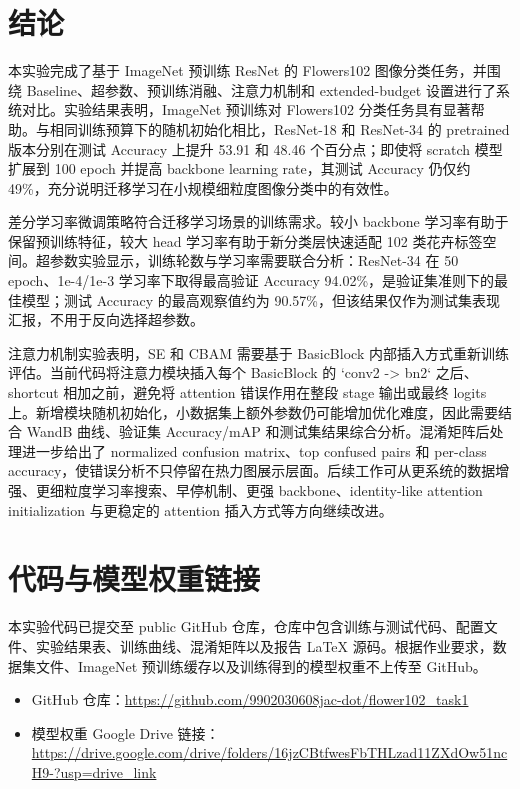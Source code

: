 \documentclass[UTF8]{ctexart}
\begin{document}
\section{结论}
本实验完成了基于 ImageNet 预训练 ResNet 的 Flowers102 图像分类任务，并围绕 Baseline、超参数、预训练消融、注意力机制和 extended-budget 设置进行了系统对比。实验结果表明，ImageNet 预训练对 Flowers102 分类任务具有显著帮助。与相同训练预算下的随机初始化相比，ResNet-18 和 ResNet-34 的 pretrained 版本分别在测试 Accuracy 上提升 53.91 和 48.46 个百分点；即使将 scratch 模型扩展到 100 epoch 并提高 backbone learning rate，其测试 Accuracy 仍仅约 49\%，充分说明迁移学习在小规模细粒度图像分类中的有效性。

差分学习率微调策略符合迁移学习场景的训练需求。较小 backbone 学习率有助于保留预训练特征，较大 head 学习率有助于新分类层快速适配 102 类花卉标签空间。超参数实验显示，训练轮数与学习率需要联合分析：ResNet-34 在 50 epoch、1e-4/1e-3 学习率下取得最高验证 Accuracy 94.02\%，是验证集准则下的最佳模型；测试 Accuracy 的最高观察值约为 90.57\%，但该结果仅作为测试集表现汇报，不用于反向选择超参数。

注意力机制实验表明，SE 和 CBAM 需要基于 BasicBlock 内部插入方式重新训练评估。当前代码将注意力模块插入每个 BasicBlock 的 `conv2 -> bn2` 之后、shortcut 相加之前，避免将 attention 错误作用在整段 stage 输出或最终 logits 上。新增模块随机初始化，小数据集上额外参数仍可能增加优化难度，因此需要结合 WandB 曲线、验证集 Accuracy/mAP 和测试集结果综合分析。混淆矩阵后处理进一步给出了 normalized confusion matrix、top confused pairs 和 per-class accuracy，使错误分析不只停留在热力图展示层面。后续工作可从更系统的数据增强、更细粒度学习率搜索、早停机制、更强 backbone、identity-like attention initialization 与更稳定的 attention 插入方式等方向继续改进。


\section{代码与模型权重链接}

本实验代码已提交至 public GitHub 仓库，仓库中包含训练与测试代码、配置文件、实验结果表、训练曲线、混淆矩阵以及报告 \LaTeX{} 源码。根据作业要求，数据集文件、ImageNet 预训练缓存以及训练得到的模型权重不上传至 GitHub。

\begin{itemize}
    \item GitHub 仓库：\url{https://github.com/9902030608jac-dot/flower102_task1}
    \item 模型权重 Google Drive 链接：\url{https://drive.google.com/drive/folders/16jzCBtfwesFbTHLzad11ZXdOw51ncH9-?usp=drive_link}
\end{itemize}
\end{document}
